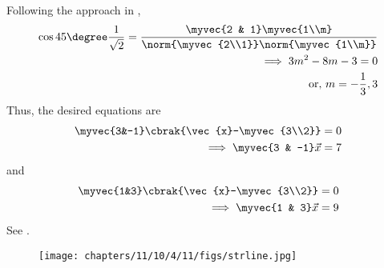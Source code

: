 Following the approach in ,
\begin{align}
\cos45\degree 
\frac{1}{\sqrt{2}} = \frac{\myvec{2 & 1} \myvec{1\\m}}{\norm{\myvec{2\\1}}\norm{\myvec{1\\m}}}
\\
\implies 
 3m^2 - 8m -3 = 0
 \\
\text{or, }
m= - \frac{1}{3}, 3
\end{align} 
Thus, the desired equations are 
\begin{align}
	\myvec{3&-1}\cbrak{\vec{x}-\myvec{3\\2}}&=0\\
 \implies 	\myvec{3 & -1}\vec{x} &= 7
\end{align}
and 
\begin{align}
	\myvec{1&3}\cbrak{\vec{x}-\myvec{3\\2}}&=0\\
		\implies 	\myvec{1 & 3}\vec{x} &= 9
\end{align}
See
.
\begin{figure}[H]
\centering
\texttt{[image: chapters/11/10/4/11/figs/strline.jpg]}
\caption{}
\label{fig:chapters/11/10/4/11/figs/strline.jpg}
\end{figure}
